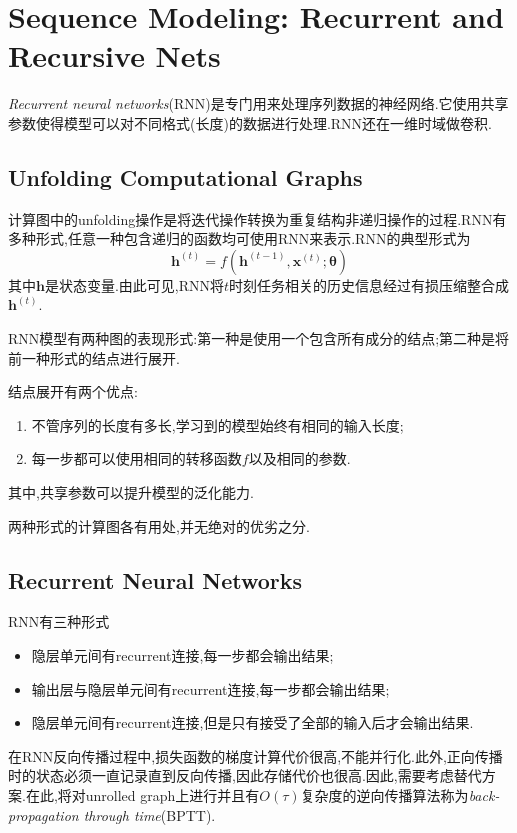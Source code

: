 \chapter{Sequence Modeling: Recurrent and Recursive Nets}

\textit{Recurrent neural networks}(RNN)是专门用来处理序列数据的神经网络.它使用共享参数使得模型可以对不同格式(长度)的数据进行处理.RNN还在一维时域做卷积.

\section{Unfolding Computational Graphs}

计算图中的unfolding操作是将迭代操作转换为重复结构非递归操作的过程.RNN有多种形式,任意一种包含递归的函数均可使用RNN来表示.RNN的典型形式为
\begin{equation}
\bm h^{(t)}=f(\bm h^{(t-1)}, \bm x^{(t)};\bm\theta)
\end{equation}
其中$\bm h$是状态变量.由此可见,RNN将$t$时刻任务相关的历史信息经过有损压缩整合成$\bm h^{(t)}$.

RNN模型有两种图的表现形式:第一种是使用一个包含所有成分的结点;第二种是将前一种形式的结点进行展开.

结点展开有两个优点:
\begin{enumerate}
    \item 不管序列的长度有多长,学习到的模型始终有相同的输入长度;
    \item 每一步都可以使用相同的转移函数$f$以及相同的参数.
\end{enumerate}
其中,共享参数可以提升模型的泛化能力.

两种形式的计算图各有用处,并无绝对的优劣之分.

\section{Recurrent Neural Networks}

RNN有三种形式
\begin{itemize}
    \item 隐层单元间有recurrent连接,每一步都会输出结果;
    \item 输出层与隐层单元间有recurrent连接,每一步都会输出结果;
    \item 隐层单元间有recurrent连接,但是只有接受了全部的输入后才会输出结果.
\end{itemize}

在RNN反向传播过程中,损失函数的梯度计算代价很高,不能并行化.此外,正向传播时的状态必须一直记录直到反向传播,因此存储代价也很高.因此,需要考虑替代方案.在此,将对unrolled graph上进行并且有$O(\tau)$复杂度的逆向传播算法称为\textit{back-propagation through time}(BPTT).

